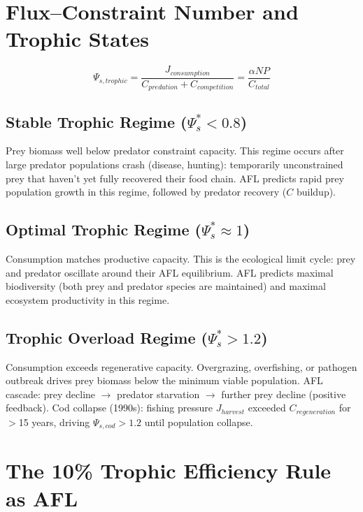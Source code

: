\documentclass[11pt]{article}
\begin{document}
\section{Flux--Constraint Number and Trophic States}

\begin{equation}
\Psi_{s,trophic} = \frac{J_{consumption}}{C_{predation} + C_{competition}} = \frac{\alpha NP}{C_{total}}
\end{equation}

\subsection{Stable Trophic Regime ($\Psi_s^* < 0.8$)}

Prey biomass well below predator constraint capacity. This regime occurs after large predator
populations crash (disease, hunting): temporarily unconstrained prey that haven't yet fully
recovered their food chain. AFL predicts rapid prey population growth in this regime, followed
by predator recovery ($C$ buildup).

\subsection{Optimal Trophic Regime ($\Psi_s^* \approx 1$)}

Consumption matches productive capacity. This is the ecological limit cycle: prey and predator
oscillate around their AFL equilibrium. AFL predicts maximal biodiversity (both prey and predator
species are maintained) and maximal ecosystem productivity in this regime.

\subsection{Trophic Overload Regime ($\Psi_s^* > 1.2$)}

Consumption exceeds regenerative capacity. Overgrazing, overfishing, or pathogen outbreak drives
prey biomass below the minimum viable population. AFL cascade: prey decline $\to$ predator
starvation $\to$ further prey decline (positive feedback). Cod collapse (1990s): fishing pressure
$J_{harvest}$ exceeded $C_{regeneration}$ for $>$15 years, driving $\Psi_{s,cod} > 1.2$ until
population collapse.

\section{The 10\% Trophic Efficiency Rule as AFL}
\end{document}
